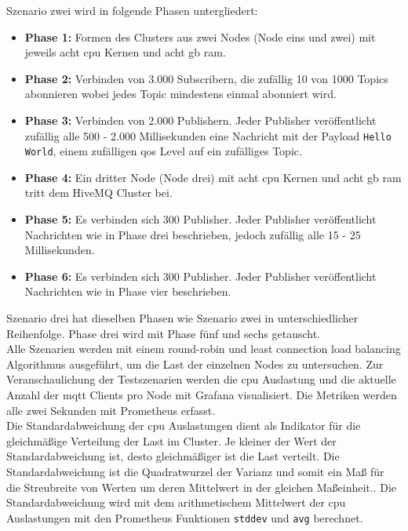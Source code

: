 Szenario zwei wird in folgende Phasen untergliedert:
\begin{itemize}
  \item \textbf{Phase 1:} Formen des Clusters aus zwei Nodes (Node eins und zwei) mit jeweils acht \ac{cpu} Kernen und acht \ac{gb} \ac{ram}.
  \item \textbf{Phase 2:} Verbinden von 3.000 Subscribern, die zufällig 10 von 1000 Topics abonnieren wobei jedes Topic mindestens einmal abonniert wird.
  \item \textbf{Phase 3:} Verbinden von 2.000 Publishern. Jeder Publisher veröffentlicht zufällig alle 500 - 2.000 Millisekunden eine Nachricht mit der Payload \verb|Hello World|, einem zufälligen \ac{qos} Level auf ein zufälliges Topic.
  \item \textbf{Phase 4:} Ein dritter Node (Node drei) mit acht \ac{cpu} Kernen und acht \ac{gb} \ac{ram} tritt dem HiveMQ Cluster bei.
  \item \textbf{Phase 5:} Es verbinden sich 300 Publisher. Jeder Publisher veröffentlicht Nachrichten wie in Phase drei beschrieben, jedoch zufällig alle 15 - 25 Millisekunden.
  \item \textbf{Phase 6:} Es verbinden sich 300 Publisher. Jeder Publisher veröffentlicht Nachrichten wie in Phase vier beschrieben.
\end{itemize}
Szenario drei hat dieselben Phasen wie Szenario zwei in unterschiedlicher Reihenfolge. Phase drei wird mit Phase fünf und sechs getauscht.
\\
Alle Szenarien werden mit einem round-robin und least connection load balancing Algorithmus ausgeführt, um die Last der einzelnen Nodes zu untersuchen.
Zur Veranschaulichung der Testszenarien werden die \ac{cpu} Auslastung und die aktuelle Anzahl der \ac{mqtt} Clients pro Node mit Grafana visualisiert. Die Metriken werden alle zwei Sekunden mit Prometheus erfasst.
\\
Die Standardabweichung der \ac{cpu} Auslastungen dient als Indikator für die gleichmä{\ss}ige Verteilung der Last im Cluster. Je kleiner der Wert der Standardabweichung ist, desto gleichmä{\ss}iger ist die Last verteilt.
Die Standardabweichung ist die Quadratwurzel der Varianz und somit ein Ma{\ss} für die Streubreite von Werten um deren Mittelwert in der gleichen Ma{\ss}einheit.\cite[S.~72]{buchterElementareStochastikEinfuhrung2005}. Die Standardabweichung wird mit dem arithmetischem Mittelwert der \ac{cpu} Auslastungen mit den Prometheus Funktionen \verb|stddev| und \verb|avg| berechnet.

